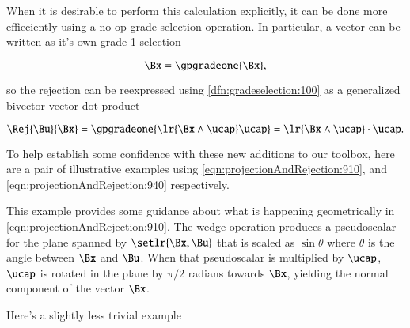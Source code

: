 When it is desirable to perform this calculation explicitly, it can be done more effieciently using a no-op grade selection operation.
In particular, a vector can be written as it's own grade-1 selection

\begin{dmath}\label{eqn:projectionAndRejection:920}
\Bx = \gpgradeone{ \Bx },
\end{dmath}

so the rejection can be reexpressed
using \cref{dfn:gradeselection:100}
as a generalized bivector-vector dot product

\begin{equation}\label{eqn:projectionAndRejection:940}
\Rej{\Bu}{\Bx}
= \gpgradeone{ \lr{ \Bx \wedge \ucap } \ucap }
= \lr{ \Bx \wedge \ucap } \cdot \ucap.
\end{equation}

To help establish some confidence with these new additions to our toolbox, here are a
pair of illustrative examples using
\cref{eqn:projectionAndRejection:910}, and
\cref{eqn:projectionAndRejection:940} respectively.


This example provides some guidance about what is happening geometrically in
\cref{eqn:projectionAndRejection:910}.
The wedge operation produces a pseudoscalar for the plane spanned by \( \setlr{\Bx, \Bu} \) that is scaled as \( \sin\theta \) where \( \theta \) is the angle between \( \Bx \) and \( \Bu \).  When that pseudoscalar is multiplied by \( \ucap \), \( \ucap \) is rotated in the plane by \( \pi/2 \) radians towards \( \Bx \), yielding the normal component of the vector \( \Bx \).

Here's a slightly less trivial  example

